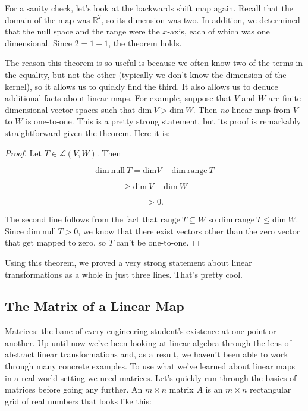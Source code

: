 \documentclass[12pt]{article}
\begin{document}
For a sanity check, let's look at the backwards shift map again. Recall that the domain of the map was $\mathbb{R}^2$, so its dimension was two. In addition, we determined that the null space and the range were the $x$-axis, each of which was one dimensional. Since $2 = 1 + 1$, the theorem holds.

The reason this theorem is so useful is because we often know two of the terms in the equality, but not the other (typically we don't know the dimension of the kernel), so it allows us to quickly find the third. It also allows us to deduce additional facts about linear maps. For example, suppose that $V$ and $W$ are finite-dimensional vector spaces such that $\textrm{dim} \: V > \textrm{dim} \: W$. Then \textit{no} linear map from $V$ to $W$ is one-to-one. This is a pretty strong statement, but its proof is remarkably straightforward given the theorem. Here it is: 

\vskip 3mm
\begin{proof}
Let $T \in \mathcal{L} (V, W)$. Then

$$ \textrm{dim} \:  \textrm{null}  \: T = \textrm{dim} V - \textrm{dim} \: \textrm{range} \: T$$

$$ \geq \textrm{dim} \: V - \textrm{dim} \: W$$

$$ > 0.$$

The second line follows from the fact that $\textrm{range} \: T \subseteq W$ so $\textrm{dim} \: \textrm{range} \: T \leq \textrm{dim} \: W$. Since $ \textrm{dim} \:  \textrm{null}  \: T > 0$, we know that there exist vectors other than the zero vector that get mapped to zero, so $T$ can't be one-to-one.
\end{proof}

Using this theorem, we proved a very strong statement about linear transformations as a whole in just three lines. That's pretty cool.

\subsection*{The Matrix of a Linear Map}

Matrices:  the bane of every engineering student's existence at one point or another. Up until now we've been looking at linear algebra through the lens of abstract linear transformations and, as a result, we haven't been able to work through many concrete examples. To use what we've learned about linear maps in a real-world setting we need matrices. Let's quickly run through the basics of matrices before going any further. An $m \times n$ matrix $A$ is an $m \times n$ rectangular grid of real numbers that looks like this:
\end{document}

